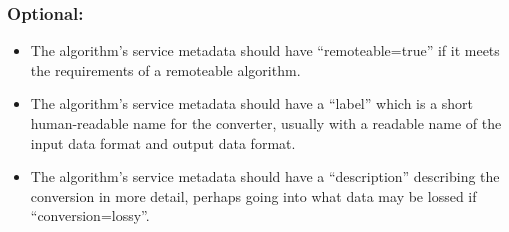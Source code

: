 \subsubsection*{Optional:}
\begin{itemize}
  
  \item The algorithm's service metadata should have ``remoteable=true'' if it
  meets the requirements of a remoteable algorithm.
  \item The algorithm's service metadata should have a ``label'' which is a
  short human-readable name for the converter, usually with a readable name of
  the input data format and output data format.
  \item The algorithm's service metadata should have a ``description''
  describing the conversion in more detail, perhaps going into what data may be
  lossed if ``conversion=lossy''.
\end{itemize}

\orgcishellserviceconversion{}
